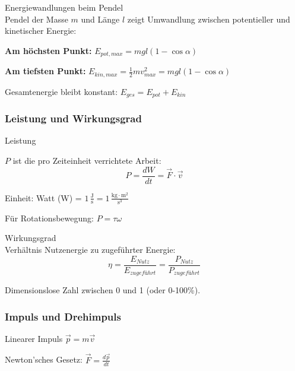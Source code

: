 \begin{example2}{Energiewandlungen beim Pendel}\\
    Pendel der Masse $m$ und Länge $l$ zeigt Umwandlung zwischen potentieller und kinetischer Energie:
    
    \textbf{Am höchsten Punkt:}
    $
        E_{pot,max} = m g l (1 - \cos\alpha)
    $
    
    \textbf{Am tiefsten Punkt:}
    $
        E_{kin,max} = \frac{1}{2} m v_{max}^2 = m g l (1 - \cos\alpha)
    $
    
    Gesamtenergie bleibt konstant: $E_{ges} = E_{pot} + E_{kin}$
\end{example2}

\subsubsection{Leistung und Wirkungsgrad}


\begin{definition}{Leistung}
    
    $P$ ist die pro Zeiteinheit verrichtete Arbeit:
    $$
        P = \frac{dW}{dt} = \vec{F} \cdot \vec{v}
    $$
    
    Einheit: Watt (W) = $1 \, \frac{\text{J}}{\text{s}} = 1 \, \frac{\text{kg} \cdot \text{m}^2}{\text{s}^3}$
    
    Für Rotationsbewegung: $P = \tau \omega$
\end{definition}

\begin{definition}{Wirkungsgrad}\\
    Verhältnis Nutzenergie zu zugeführter Energie:
    $$
        \eta = \frac{E_{Nutz}}{E_{zugeführt}} = \frac{P_{Nutz}}{P_{zugeführt}}
    $$
    
    Dimensionslose Zahl zwischen 0 und 1 (oder 0-100\%).
\end{definition}

\multend

\raggedcolumns
\columnbreak

\subsubsection{Impuls und Drehimpuls}


\begin{definition}{Linearer Impuls}
    $
        \vec{p} = m\vec{v}
    $
    
    Newton'sches Gesetz: $\vec{F} = \frac{d\vec{p}}{dt}$
\end{definition}

